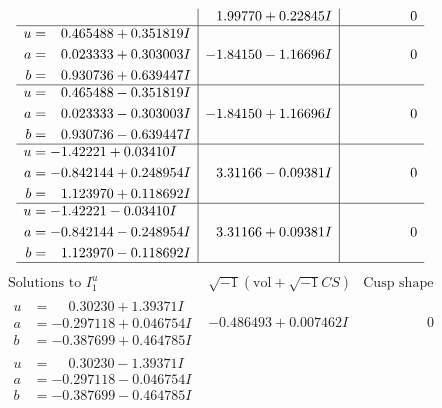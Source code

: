\documentclass[1p]{elsarticle_modified}
\theoremstyle{definition}
\newcommand{\I}{\sqrt{-1}}
\begin{document}
$$\begin{array}{c|c|c}
 & \phantom{-}1.99770 + 0.22845 I & \phantom{-0.000000 } 0 \\ \hline\begin{aligned}
u &= \phantom{-}0.465488 + 0.351819 I \\
a &= \phantom{-}0.023333 + 0.303003 I \\
b &= \phantom{-}0.930736 + 0.639447 I\end{aligned}
 & -1.84150 - 1.16696 I & \phantom{-0.000000 } 0 \\ \hline\begin{aligned}
u &= \phantom{-}0.465488 - 0.351819 I \\
a &= \phantom{-}0.023333 - 0.303003 I \\
b &= \phantom{-}0.930736 - 0.639447 I\end{aligned}
 & -1.84150 + 1.16696 I & \phantom{-0.000000 } 0 \\ \hline\begin{aligned}
u &= -1.42221 + 0.03410 I \\
a &= -0.842144 + 0.248954 I \\
b &= \phantom{-}1.123970 + 0.118692 I\end{aligned}
 & \phantom{-}3.31166 - 0.09381 I & \phantom{-0.000000 } 0 \\ \hline\begin{aligned}
u &= -1.42221 - 0.03410 I \\
a &= -0.842144 - 0.248954 I \\
b &= \phantom{-}1.123970 - 0.118692 I\end{aligned}
 & \phantom{-}3.31166 + 0.09381 I & \phantom{-0.000000 } 0\\
 \hline 
 \end{array}$$\newpage$$\begin{array}{c|c|c}  
\text{Solutions to }I^u_{1}& \I (\text{vol} + \sqrt{-1}CS) & \text{Cusp shape}\\
 \hline 
\begin{aligned}
u &= \phantom{-}0.30230 + 1.39371 I \\
a &= -0.297118 + 0.046754 I \\
b &= -0.387699 + 0.464785 I\end{aligned}
 & -0.486493 + 0.007462 I & \phantom{-0.000000 } 0 \\ \hline\begin{aligned}
u &= \phantom{-}0.30230 - 1.39371 I \\
a &= -0.297118 - 0.046754 I \\
b &= -0.387699 - 0.464785 I\end{aligned}

\end{array}$$
\end{document}
